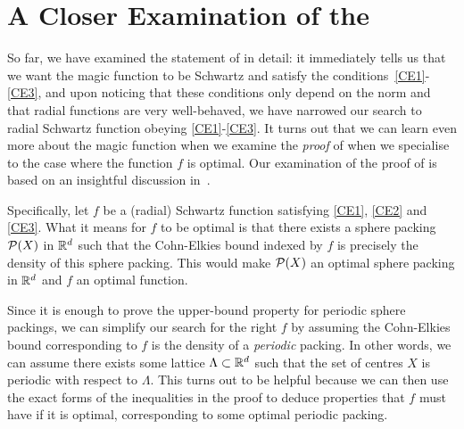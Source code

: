 \section{A Closer Examination of the \CELP}

So far, we have examined the statement of  in detail: it immediately tells us that we want the magic function to be Schwartz and satisfy the conditions~\ref{CE1}-\ref{CE3}, and upon noticing that these conditions only depend on the norm and that radial functions are very well-behaved, we have narrowed our search to radial Schwartz function obeying \ref{CE1}-\ref{CE3}. It turns out that we can learn even more about the magic function when we examine the \textit{proof} of  when we specialise to the case where the function $f$ is optimal. Our examination of the proof of  is based on an insightful discussion in~\cite[p. 8]{CohnOnViazovskaICM}.

Specifically, let $f$ be a (radial) Schwartz function satisfying \ref{CE1}, \ref{CE2} and \ref{CE3}. What it means for $f$ to be optimal is that there exists a sphere packing $\mathcal{P}(X)$ in $\mathbb{R}^d$ such that the Cohn-Elkies bound indexed by $f$ is precisely the density of this sphere packing. This would make $\mathcal{P}(X)$ an optimal sphere packing in $\mathbb{R}^d$ and $f$ an optimal function.

Since it is enough to prove the upper-bound property for periodic sphere packings, we can simplify our search for the right $f$ by assuming the Cohn-Elkies bound corresponding to $f$ is the density of a \textit{periodic} packing. In other words, we can assume there exists some lattice $\Lambda \subset \mathbb{R}^d$ such that the set of centres $X$ is periodic with respect to $\Lambda$. This turns out to be helpful because we can then use the exact forms of the inequalities in the proof to deduce properties that $f$ must have if it is optimal, corresponding to some optimal periodic packing.


